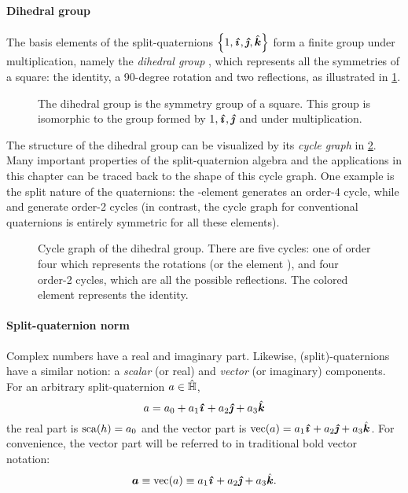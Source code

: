 \paragraph{Dihedral group} The basis elements of the split-quaternions $\qty{1, \quati, \quatj, \quatk}$ form a finite group under multiplication, namely the \emph{dihedral group} , which represents all the symmetries of a square: the identity, a 90-degree rotation and two reflections, as illustrated in \cref{fig:square_symmetry}. \cite{Dummit2004}
\begin{figure}[ht!]
    \centering
    
    \caption{The dihedral group  is the symmetry group of a square. This group is isomorphic to the group formed by $1, \quati, \quatj$ and \quatk under multiplication.}
    \label{fig:square_symmetry}
\end{figure}

The structure of the dihedral group can be visualized by its \emph{cycle graph} in \cref{fig:cycle_graph}. Many important properties of the split-quaternion algebra and the applications in this chapter can be traced back to the shape of this cycle graph. One example is the split nature of the quaternions: the \quati-element generates an order-4 cycle, while \quatj and \quatk generate order-2 cycles (in contrast, the cycle graph for conventional quaternions is entirely symmetric for all these elements). \cite{Dummit2004}
\begin{figure}[h!]
    \centering
    
    \caption{Cycle graph of the dihedral group. There are five cycles: one of order four which represents the rotations (or the element \quati), and four order-2 cycles, which are all the possible reflections. The colored element represents the identity.}
    \label{fig:cycle_graph}
\end{figure}

\paragraph{Split-quaternion norm} Complex numbers have a real and imaginary part. Likewise, (split)-quaternions have a similar notion: a \emph{scalar} (or real) and \emph{vector} (or imaginary) components. For an arbitrary split-quaternion $a \in \hat{\mathbb{H}}$, \cite{Jafari2014}
$$ a = \quat{a_0}{a_1}{a_2}{a_3} $$
the real part is $\mathrm{sca}\qty(h) = a_0$ and the vector part is $ \vecpart{a} = \quatvec{a_1}{a_2}{a_3}$. For convenience, the vector part will be referred to in traditional bold vector notation:
$$ \vec{a} \equiv \vecpart{a} \equiv \quatvec{a_1}{a_2}{a_3}. $$

